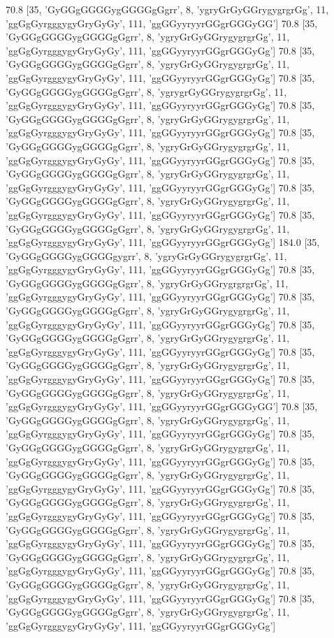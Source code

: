 70.8 [35, 'GyGGgGGGGygGGGGgGgrr', 8, 'ygryGrGyGGrygygrgrGg', 11, 'ggGgGyrgggygyGryGyGy', 111, 'ggGGyyryyrGGgrGGGyGG']
70.8 [35, 'GyGGgGGGGygGGGGgGgrr', 8, 'ygryGrGyGGrygygrgrGg', 11, 'ggGgGyrgggygyGryGyGy', 111, 'ggGGyyryyrGGgrGGGyGg']
70.8 [35, 'GyGGgGGGGygGGGGgGgrr', 8, 'ygryGrGyGGrygygrgrGg', 11, 'ggGgGyrgggygyGryGyGy', 111, 'ggGGyyryyrGGgrGGGyGg']
70.8 [35, 'GyGGgGGGGygGGGGgGgrr', 8, 'ygrygrGyGGrygygrgrGg', 11, 'ggGgGyrgggygyGryGyGy', 111, 'ggGGyyryyrGGgrGGGyGg']
70.8 [35, 'GyGGgGGGGygGGGGgGgrr', 8, 'ygryGrGyGGrygygrgrGg', 11, 'ggGgGyrgggygyGryGyGy', 111, 'ggGGyyryyrGGgrGGGyGg']
70.8 [35, 'GyGGgGGGGygGGGGgGgrr', 8, 'ygryGrGyGGrygygrgrGg', 11, 'ggGgGyrgggygyGryGyGy', 111, 'ggGGyyryyrGGgrGGGyGg']
70.8 [35, 'GyGGgGGGGygGGGGgGgrr', 8, 'ygryGrGyGGrygygrgrGg', 11, 'ggGgGyrgggygyGryGyGy', 111, 'ggGGyyryyrGGgrGGGyGg']
70.8 [35, 'GyGGgGGGGygGGGGgGgrr', 8, 'ygryGrGyGGrygygrgrGg', 11, 'ggGgGyrgggygyGryGyGy', 111, 'ggGGyyryyrGGgrGGGyGg']
70.8 [35, 'GyGGgGGGGygGGGGgGgrr', 8, 'ygryGrGyGGrygygrgrGg', 11, 'ggGgGyrgggygyGryGyGy', 111, 'ggGGyyryyrGGgrGGGyGg']
184.0 [35, 'GyGGgGGGGygGGGGgygrr', 8, 'ygryGrGyGGrygygrgrGg', 11, 'ggGgGyrgggygyGryGyGy', 111, 'ggGGyyryyrGGgrGGGyGg']
70.8 [35, 'GyGGgGGGGygGGGGgGgrr', 8, 'ygryGrGyGGrygrgrgrGg', 11, 'ggGgGyrgggygyGryGyGy', 111, 'ggGGyyryyrGGgrGGGyGg']
70.8 [35, 'GyGGgGGGGygGGGGgGgrr', 8, 'ygryGrGyGGrygygrgrGg', 11, 'ggGgGyrgggygyGryGyGy', 111, 'ggGGyyryyrGGgrGGGyGg']
70.8 [35, 'GyGGgGGGGygGGGGgGgrr', 8, 'ygryGrGyGGrygygrgrGg', 11, 'ggGgGyrgggygyGryGyGy', 111, 'ggGGyyryyrGGgrGGGyGg']
70.8 [35, 'GyGGgGGGGygGGGGgGgrr', 8, 'ygryGrGyGGrygygrgrGg', 11, 'ggGgGyrgggygyGryGyGy', 111, 'ggGGyyryyrGGgrGGGyGg']
70.8 [35, 'GyGGgGGGGygGGGGgGgrr', 8, 'ygryGrGyGGrygygrgrGg', 11, 'ggGgGyrgggygyGryGyGy', 111, 'ggGGyyryyrGGgrGGGyGG']
70.8 [35, 'GyGGgGGGGygGGGGgGgrr', 8, 'ygryGrGyGGrygygrgrGg', 11, 'ggGgGyrgggygyGryGyGy', 111, 'ggGGyyryyrGGgrGGGyGg']
70.8 [35, 'GyGGgGGGGygGGGGgGgrr', 8, 'ygryGrGyGGrygygrgrGg', 11, 'ggGgGyrgggygyGryGyGy', 111, 'ggGGyyryyrGGgrGGGyGg']
70.8 [35, 'GyGGgGGGGygGGGGgGgrr', 8, 'ygryGrGyGGrygygrgrGg', 11, 'ggGgGyrgggygyGryGyGy', 111, 'ggGGyyryyrGGgrGGGyGg']
70.8 [35, 'GyGGgGGGGygGGGGgGgrr', 8, 'ygryGrGyGGrygygrgrGg', 11, 'ggGgGyrgggygyGryGyGy', 111, 'ggGGyyryyrGGgrGGGyGg']
70.8 [35, 'GyGGgGGGGygGGGGgGgrr', 8, 'ygryGrGyGGrygygrgrGg', 11, 'ggGgGyrgggygyGryGyGy', 111, 'ggGGyyryyrGGgrGGGyGg']
70.8 [35, 'GyGGgGGGGygGGGGgGgrr', 8, 'ygryGrGyGGrygygrgrGg', 11, 'ggGgGyrgggygyGryGyGy', 111, 'ggGGyyryyrGGgrGGGyGg']
70.8 [35, 'GyGGgGGGGygGGGGgGgrr', 8, 'ygryGrGyGGrygygrgrGg', 11, 'ggGgGyrgggygyGryGyGy', 111, 'ggGGyyryyrGGgrGGGyGg']
70.8 [35, 'GyGGgGGGGygGGGGgGgrr', 8, 'ygryGrGyGGrygygrgrGg', 11, 'ggGgGyrgggygyGryGyGy', 111, 'ggGGyyryyrGGgrGGGyGg']
